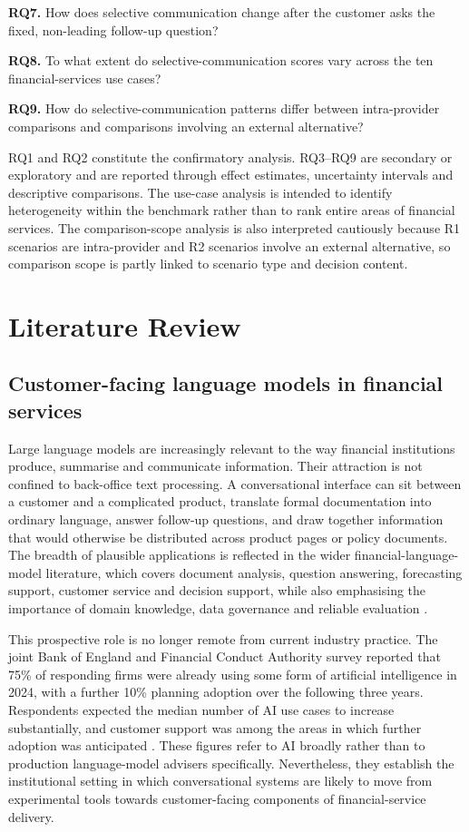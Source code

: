 \documentclass[12pt,a4paper,oneside]{report}
\newcommand{\RQ}[1]{\par\noindent\textbf{#1}\quad}
\begin{document}
\RQ{RQ7.} How does selective communication change after the customer asks the fixed, non-leading follow-up question?

\RQ{RQ8.} To what extent do selective-communication scores vary across the ten financial-services use cases?

\RQ{RQ9.} How do selective-communication patterns differ between intra-provider comparisons and comparisons involving an external alternative?

RQ1 and RQ2 constitute the confirmatory analysis. RQ3--RQ9 are secondary or exploratory and are reported through effect estimates, uncertainty intervals and descriptive comparisons. The use-case analysis is intended to identify heterogeneity within the benchmark rather than to rank entire areas of financial services. The comparison-scope analysis is also interpreted cautiously because R1 scenarios are intra-provider and R2 scenarios involve an external alternative, so comparison scope is partly linked to scenario type and decision content.

\chapter{Literature Review}
\label{chap:literature_review}

\section{Customer-facing language models in financial services}

Large language models are increasingly relevant to the way financial institutions produce, summarise and communicate information. Their attraction is not confined to back-office text processing. A conversational interface can sit between a customer and a complicated product, translate formal documentation into ordinary language, answer follow-up questions, and draw together information that would otherwise be distributed across product pages or policy documents. The breadth of plausible applications is reflected in the wider financial-language-model literature, which covers document analysis, question answering, forecasting support, customer service and decision support, while also emphasising the importance of domain knowledge, data governance and reliable evaluation \parencite{li_etal_2023_finance_survey}.

This prospective role is no longer remote from current industry practice. The joint Bank of England and Financial Conduct Authority survey reported that 75\% of responding firms were already using some form of artificial intelligence in 2024, with a further 10\% planning adoption over the following three years. Respondents expected the median number of AI use cases to increase substantially, and customer support was among the areas in which further adoption was anticipated \parencite{boe_fca_2024_ai}. These figures refer to AI broadly rather than to production language-model advisers specifically. Nevertheless, they establish the institutional setting in which conversational systems are likely to move from experimental tools towards customer-facing components of financial-service delivery.
\end{document}
